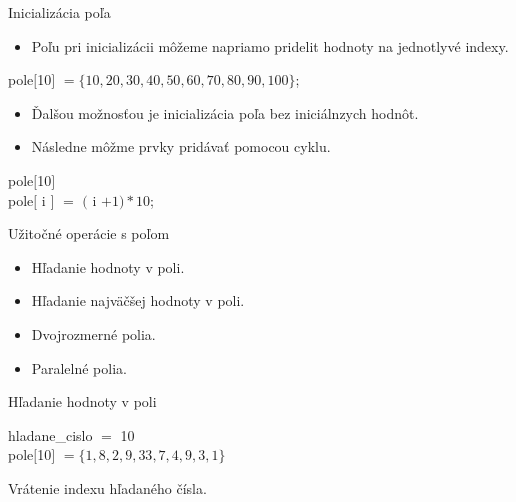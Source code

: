 \documentclass[10pt,xcolor=pdflatex,hyperref={unicode}]{beamer}
\begin{document}
\begin{frame}{Inicializácia poľa}
    
    \begin{itemize}
    \item Poľu pri inicializácii môžeme napriamo pridelit hodnoty na jednotlyvé indexy.
    \end{itemize}

    \begin{algorithm}[H]
        pole$[$10$]$ $= \{10, 20, 30, 40, 50, 60, 70, 80, 90, 100\}$;
    \end{algorithm}
    \bigskip
    
    \begin{itemize}
        \item Ďalšou možnosťou je inicializácia poľa bez iniciálnzych hodnôt.
        \item Následne môžme prvky pridávať pomocou cyklu.
    \end{itemize}
    
     \begin{algorithm}[H]
        pole$[$10$]$\\
         {
            \Indpp
           pole$[$ i $]$ $=$ $($ i $ + 1) * 10$;
        }
    \end{algorithm}
    
\end{frame}

\begin{frame}{Užitočné operácie s poľom}

    \begin{itemize}
    \item Hľadanie hodnoty v poli.
    \item Hľadanie najväčšej hodnoty v poli.
    \item Dvojrozmerné polia.
    \item Paralelné polia.
    \end{itemize}

\end{frame}


\begin{frame}{Hľadanie hodnoty v poli}
     \begin{algorithm}[H]
        hladane\_cislo $=$ 10\\
        pole$[$10$]$ $= \{1,8,2,9,33,7,4,9,3,1\}$\\
         {
            \Indpp
            
        }
    \caption{Vrátenie indexu hľadaného čísla.}
    \end{algorithm}

\end{frame}
\end{document}
